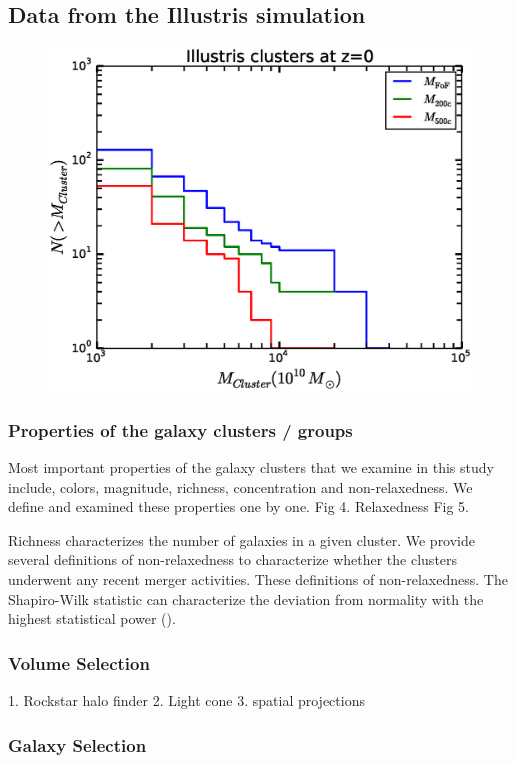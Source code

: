 \documentclass[letterpaper,useAMS,usenatbib]{mn2e}
\begin{document}
\subsection{Data from the Illustris simulation} 
\begin{figure}
	\includegraphics[width=.95\linewidth]{clusterMassDist.eps}
	\caption{
		\label{fig:config}}
\end{figure}


\subsubsection{Properties of the galaxy clusters / groups}
Most important properties of the galaxy clusters that we examine in this
study include, colors, magnitude, richness, concentration and non-relaxedness. We define
and examined these properties one by one. 
Fig 4. Relaxedness 
Fig 5. 

Richness characterizes the number of galaxies in a given cluster.
We provide several definitions of non-relaxedness to characterize whether
the clusters underwent any recent merger activities. These definitions of
non-relaxedness.
The Shapiro-Wilk statistic can characterize the deviation from normality
with the highest statistical power ().


\subsubsection{Volume Selection}
1. Rockstar halo finder 
2. Light cone 
3. spatial projections 
\subsubsection{Galaxy Selection}
\end{document}
